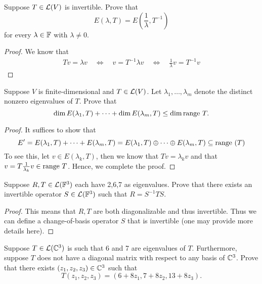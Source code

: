 \documentclass{extarticle}
\begin{document}
\begin{problem}{7}
    Suppose \(T \in \mathcal{L}(V)\) is invertible. Prove that 
    \[E(\lambda, T) = E(\frac{1}{\lambda}, T^{-1})\]
    for every \(\lambda \in \mathbb{F}\) with \(\lambda \neq 0\). 
\end{problem}

\begin{proof}
We know that 
\begin{align*}
    Tv = \lambda v \quad \Longleftrightarrow \quad
    v = T^{-1} \lambda v  \quad \Longleftrightarrow \quad 
    \frac{1}{\lambda}v = T^{-1} v
\end{align*}
\end{proof}

\begin{problem}{8}
    Suppose \(V\) is finite-dimensional and \(T \in \mathcal{L}(V)\). Let \(\lambda_1, \ldots, \lambda_m\) denote 
    the distinct nonzero eigenvalues of \(T\). Prove that 
    \[\dim E(\lambda_1, T) + \cdots + \dim E(\lambda_m, T) \leq \dim \text{range } T.\]
\end{problem}

\begin{proof}
It suffices to show that 
\[E' = E(\lambda_1, T) + \cdots + E(\lambda_m, T) = E(\lambda_1, T) \oplus \cdots \oplus E(\lambda_m, T) 
\subseteq \text{range } (T)\]
To see this, let \(v \in E(\lambda_k, T)\), then we know that \(Tv = \lambda_k v\) and that 
\(v = T \frac{1}{\lambda_k}v  \in \text{range } T\). Hence, we complete the proof. 
\end{proof}

\begin{problem}{9}
    Suppose \(R, T \in \mathcal{L}(\mathbb{F}^3)\) each have 2,6,7 as eigenvalues. Prove that there exists an invertible 
    operator \(S \in \mathcal{L}(\mathbb{F}^3)\) such that \(R = S^{-1}TS\).
\end{problem}

\begin{proof}
This means that \(R, T\) are both diagonalizable and thus invertible. Thus we can define a change-of-basis 
operator \(S\) that is invertible (one may provide more details here).
\end{proof}

\begin{problem}{12}
    Suppose \(T \in \mathcal{L}(\mathbb{C}^3)\) is such that 6 and 7 are eigenvalues of \(T\). Furthermore, suppose \(T\) 
    does not have a diagonal matrix with respect to any basis of \(\mathbb{C}^3\). Prove that there exists 
    \((z_1, z_2, z_3) \in \mathbb{C}^3\) such that 
    \[T(z_1, z_2, z_3) = (6 + 8 z_1, 7 + 8z_2, 13 + 8 z_3).\]
\end{problem}
\end{document}
